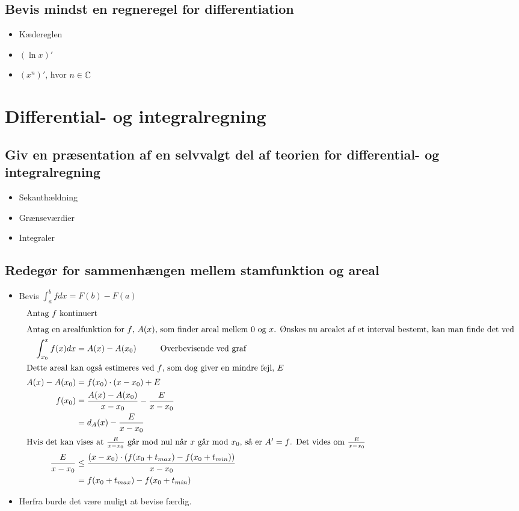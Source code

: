 \documentclass{article}
\begin{document}
\subsection{Bevis mindst en regneregel for differentiation}
\begin{itemize}
	\item Kædereglen
	\item $(\ln{x})'$
	\item $(x^n)'$, hvor $n\in\mathbb{C}$
\end{itemize}

\section{Differential- og integralregning}
\subsection{Giv en præsentation af en selvvalgt del af teorien for 
differential- og integralregning}
\begin{itemize}
	\item Sekanthældning
	\item Grænseværdier
	\item Integraler
\end{itemize}

\subsection{Redegør for sammenhængen mellem stamfunktion og areal}
\begin{itemize}
	\item Bevis $\int_a^b f dx = F(b)-F(a)$ 
\begin{align*}
	\intertext{Antag $f$ kontinuert}
	\intertext{Antag en arealfunktion for $f$, $A(x)$, som finder areal mellem
	0 og $x$. Ønskes nu arealet af et interval bestemt, kan man finde det ved}
	\int_{x_0}^x f(x) dx &= A(x) - A(x_0)\hspace{1cm}\text{Overbevisende ved graf}\\
	\intertext{Dette areal kan også estimeres ved $f$, som dog giver en mindre
	fejl, $E$}
	A(x) - A(x_0) &= f(x_0)\cdot (x-x_0) + E\\
	f(x_0) &= \frac{A(x)-A(x_0)}{x-x_0} - \frac{E}{x-x_0}\\
	 &= d_A(x) - \frac{E}{x-x_0}\\
	 \intertext{Hvis det kan vises at $\frac{E}{x-x_0}$ går mod nul når $x$ går
	 mod $x_0$, så er $A' = f$. Det vides om $\frac{E}{x-x_0}$}
	\frac{E}{x-x_0} &\le \frac{(x-x_0)\cdot (f(x_0+t_{max})-f(x_0+t_{min}))}
	{x-x_0}\\
	&=f(x_0+t_{max})-f(x_0+t_{min})
\end{align*}
	\item Herfra burde det være muligt at bevise færdig.
\end{itemize} 
\end{document}
